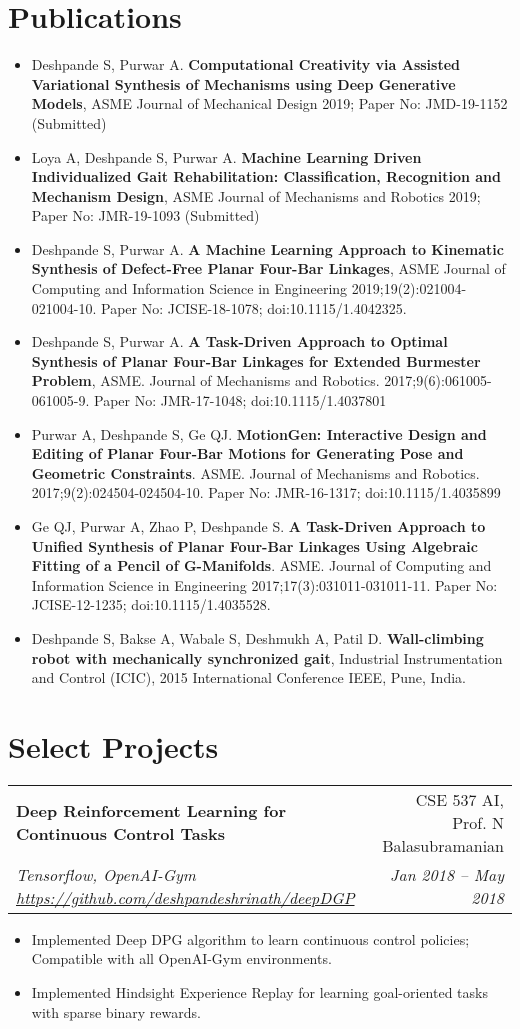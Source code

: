 \documentclass[letterpaper,10pt]{article}
\makeatletter
\newcommand{\resumeHeading}[4]{
  \vspace{-1pt}
    \begin{tabular*}{0.97\textwidth}{l@{\extracolsep{\fill}}r}
      \textbf{#1} & #2 \vspace{-2pt}\\ \vspace{1pt}
      \textit{\small#3} & \textit{\small #4} \\
    \end{tabular*}
}
\newcommand{\resumeSection}[1]{
\vspace{-12pt}
\section{\textbf{#1}}
}
\newcommand{\resumeItemListStart}{
\vspace{-7pt}
\begin{itemize}[leftmargin=14pt]
}
\newcommand{\resumeItemListEnd}{
\vspace{+7pt}
\end{itemize}
}
\newcommand{\resumeItem}[1]{
  \item\small{
      {#1 \vspace{-7pt}
      }
  }
}
\makeatother
\begin{document}
\resumeSection{Publications}
\vspace{+7pt}
    \resumeItemListStart
      \resumeItem{Deshpande S, Purwar A. \textbf{Computational Creativity via Assisted Variational Synthesis of Mechanisms using Deep Generative Models},  ASME Journal of Mechanical Design 2019; Paper No: JMD-19-1152 (Submitted)}
      \resumeItem{Loya A, Deshpande S, Purwar A. \textbf{Machine Learning Driven Individualized Gait Rehabilitation: Classification, Recognition and Mechanism Design},  ASME Journal of Mechanisms and Robotics 2019; Paper No: JMR-19-1093 (Submitted)}
      \resumeItem{Deshpande S, Purwar A. \textbf{A Machine Learning Approach to Kinematic Synthesis of Defect-Free Planar Four-Bar Linkages},  ASME Journal of Computing and Information Science in Engineering 2019;19(2):021004-021004-10. Paper No: JCISE-18-1078; doi:10.1115/1.4042325.}
      \resumeItem{Deshpande S, Purwar A. \textbf{A Task-Driven Approach to Optimal Synthesis of Planar Four-Bar Linkages for Extended Burmester Problem}, ASME. Journal of Mechanisms and Robotics. 2017;9(6):061005-061005-9. Paper No: JMR-17-1048; doi:10.1115/1.4037801}
      \resumeItem{Purwar A, Deshpande S, Ge QJ. \textbf{MotionGen: Interactive Design and Editing of Planar Four-Bar Motions for Generating Pose and Geometric Constraints}. ASME. Journal of Mechanisms and Robotics. 2017;9(2):024504-024504-10. Paper No: JMR-16-1317; doi:10.1115/1.4035899}
      \resumeItem{Ge QJ, Purwar A, Zhao P, Deshpande S. \textbf{A Task-Driven Approach to Unified Synthesis of Planar Four-Bar Linkages Using Algebraic Fitting of a Pencil of G-Manifolds}. ASME. Journal of Computing and Information Science in Engineering 2017;17(3):031011-031011-11. Paper No: JCISE-12-1235; doi:10.1115/1.4035528.}
      \resumeItem{Deshpande S, Bakse A, Wabale S, Deshmukh A, Patil D. \textbf{Wall-climbing robot with mechanically synchronized gait}, Industrial Instrumentation and Control (ICIC), 2015 International Conference IEEE, Pune, India.}
    \resumeItemListEnd


    \resumeSection{Select Projects}

    \resumeHeading{Deep Reinforcement Learning for Continuous Control Tasks}{CSE 537 AI, Prof. N Balasubramanian}{Tensorflow, OpenAI-Gym \href{https://github.com/deshpandeshrinath/deepDGP}{https://github.com/deshpandeshrinath/deepDGP}}{Jan 2018 -- May 2018}
    \resumeItemListStart
      \resumeItem{Implemented Deep DPG algorithm to learn continuous control policies; Compatible with all OpenAI-Gym environments.}
      \resumeItem{Implemented Hindsight Experience Replay for learning goal-oriented tasks with sparse binary rewards.}
    \resumeItemListEnd
\end{document}
